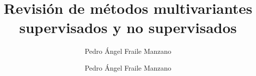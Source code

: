 \documentclass[11pt]{beamer}
\author{Pedro Ángel Fraile Manzano}
\title{Revisión de métodos multivariantes supervisados y no supervisados}
\author{Pedro Ángel Fraile Manzano}
\numberwithin{equation}{section}
\theoremstyle{definition}
\theoremstyle{definition}
\theoremstyle{definition}
\theoremstyle{definition}
\begin{document}
\begin{frame}
\titlepage
\end{frame}

\begin{frame}
\tableofcontents
\end{frame}





\end{document}
